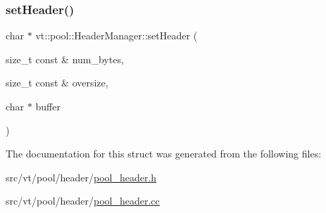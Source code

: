 \mbox{\label{structvt_1_1pool_1_1_header_manager_a1a11da8d1cf25c68ac3ff7ded5eb3a82}} 
\subsubsection{\texorpdfstring{set\+Header()}{setHeader()}}
{\footnotesize\ttfamily char $\ast$ vt\+::pool\+::\+Header\+Manager\+::set\+Header (\begin{DoxyParamCaption}\item[{size\+\_\+t const \&}]{num\+\_\+bytes,  }\item[{size\+\_\+t const \&}]{oversize,  }\item[{char $\ast$}]{buffer }\end{DoxyParamCaption})\hspace{0.3cm}{\ttfamily [static]}}



The documentation for this struct was generated from the following files\+:\begin{DoxyCompactItemize}
\item 
src/vt/pool/header/\hyperlink{pool__header_8h}{pool\+\_\+header.\+h}\item 
src/vt/pool/header/\hyperlink{pool__header_8cc}{pool\+\_\+header.\+cc}\end{DoxyCompactItemize}
